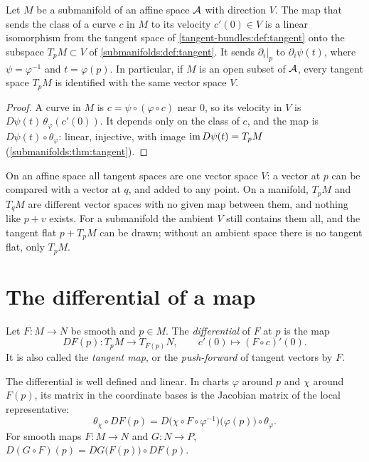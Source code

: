 \begin{notechapter}
\begin{proposition}
\label{tangent-bundles:prop:consistent}
Let $M$ be a submanifold of an affine space $\mathcal{A}$ with direction $V$.
The map that sends the class of a curve $c$ in $M$ to its velocity
$c'(0)\in V$ is a linear isomorphism from the tangent space of
\cref{tangent-bundles:def:tangent} onto the subspace $T_pM\subset V$ of
\cref{submanifolds:def:tangent}. It sends $\partial_i|_p$ to
$\partial_i\psi(t)$, where $\psi = \varphi^{-1}$ and $t = \varphi(p)$. In
particular, if $M$ is an open subset of $\mathcal{A}$, every tangent space
$T_pM$ is identified with the same vector space $V$.
\end{proposition}

\begin{proof}
A curve in $M$ is $c = \psi\circ(\varphi\circ c)$ near $0$, so its
velocity in $V$ is $D\psi(t)\,\theta_\varphi(c'(0))$. It depends only on
the class of $c$, and the map is $D\psi(t)\circ\theta_\varphi$: linear,
injective, with image $\operatorname{im} D\psi(t) = T_pM$
(\cref{submanifolds:thm:tangent}).
\end{proof}

\begin{keyidea}
On an affine space all tangent spaces are one vector space $V$: a vector
at $p$ can be compared with a vector at $q$, and added to any point. On a
manifold, $T_pM$ and $T_qM$ are different vector spaces with no given
map between them, and nothing like $p + v$ exists. For a submanifold the
ambient $V$ still contains them all, and the tangent flat $p + T_pM$ can
be drawn; without an ambient space there is no tangent flat, only
$T_pM$.
\end{keyidea}

\section{The differential of a map}\label{tangent-bundles:sec:differential}

\begin{definition}[Differential]\label{tangent-bundles:def:differential}
Let $F:M\to N$ be smooth and $p\in M$. The \emph{differential} of $F$ at
$p$ is the map
\[
  DF(p):T_pM\to T_{F(p)}N , \qquad c'(0)\mapsto(F\circ c)'(0) .
\]
It is also called the \emph{tangent map}, or the \emph{push-forward} of
tangent vectors by $F$.
\end{definition}

\begin{proposition}\label{tangent-bundles:prop:differential}
The differential is well defined and linear. In charts $\varphi$ around
$p$ and $\chi$ around $F(p)$, its matrix in the coordinate bases is the
Jacobian matrix of the local representative:
\[
  \theta_\chi\circ DF(p)
  = D\bigl(\chi\circ F\circ\varphi^{-1}\bigr)\bigl(\varphi(p)\bigr)
    \circ\theta_\varphi .
\]
For smooth maps $F:M\to N$ and $G:N\to P$,
$D(G\circ F)(p) = DG\bigl(F(p)\bigr)\circ DF(p)$.
\end{proposition}


\end{notechapter}
